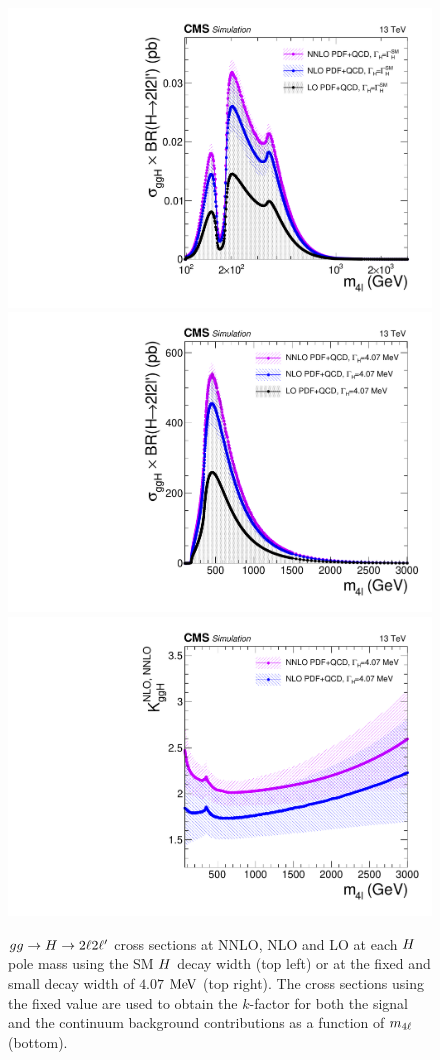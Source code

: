 \begin{figure}[!htb]
\centering
\includegraphics[width=0.48\linewidth]{Figures/IrrBkg/cCompare_hnnlo_ggHZZ2l2l_xsec.pdf}
\includegraphics[width=0.48\linewidth]{Figures/IrrBkg/cCompare_hnnlo_ggHZZ2l2l_narrowwidth_xsec.pdf}\\
\includegraphics[width=0.48\linewidth]{Figures/IrrBkg/cCompare_hnnlo_ggHZZ2l2l_narrowwidth_kfactor.pdf}
\caption{$gg\to H\to2\ell2\ell^\prime$ cross sections at NNLO, NLO and LO at each $H$ pole mass using the SM $H$ decay width (top left) or at the fixed and small decay width of $4.07$ $\mathrm{Me\kern -0.1em V}$ (top right). The cross sections using the fixed value are used to obtain the $k$-factor for both the signal and the continuum background contributions as a function of $m_{4\ell}$ (bottom).
}
\label{fig:ggHZZXsecKfactor}
\end{figure}


